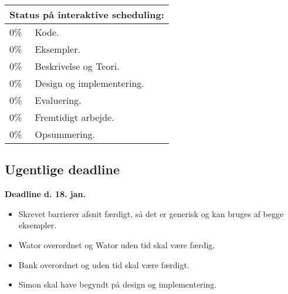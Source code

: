 \begin{tabular}{m{0.5cm}m{4cm}}
\hline  
\multicolumn{2}{m{4.5cm}}{\textbf{Status på interaktive scheduling:}} \\
\hline
0\% & Kode.  \\ 
0\% & Eksempler.\\
0\% & Beskrivelse og Teori.\\
0\% & Design og  implementering. \\
0\% & Evaluering. \\
0\% & Fremtidigt arbejde. \\
0\% & Opsummering. \\ 
\hline
\end{tabular}
\subsection*{Ugentlige deadline}
\textbf{Deadline d. 18. jan.}
\begin{itemize}{}{}\tightlist
\item Skrevet barrierer afsnit færdigt, så det er generisk og kan bruges af begge eksempler.
\item Wator overordnet og Wator uden tid skal være færdig.
\item Bank overordnet og uden tid skal være færdigt.
\item Simon skal have begyndt på design og implementering.
\end{itemize}